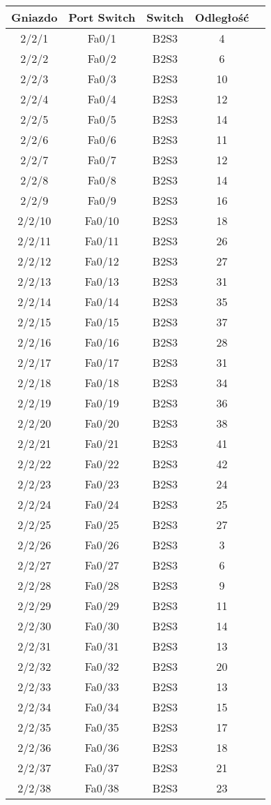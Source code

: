 \begin{center}
    \begin{longtable}{|c|c|c|c|c|}
    \hline
    Gniazdo & Port Switch & Switch & Odległość \\ \hline
	2/2/1 & Fa0/1 & B2S3 & 4 \\ \hline
	2/2/2 & Fa0/2 & B2S3 & 6 \\ \hline
	2/2/3 & Fa0/3 & B2S3 & 10 \\ \hline
	2/2/4 & Fa0/4 & B2S3 & 12 \\ \hline
	2/2/5 & Fa0/5 & B2S3 & 14 \\ \hline
	2/2/6 & Fa0/6 & B2S3 & 11 \\ \hline
	2/2/7 & Fa0/7 & B2S3 & 12 \\ \hline
	2/2/8 & Fa0/8 & B2S3 & 14 \\ \hline
	2/2/9 & Fa0/9 & B2S3 & 16 \\ \hline
	2/2/10 & Fa0/10 & B2S3 & 18 \\ \hline
	2/2/11 & Fa0/11 & B2S3 & 26 \\ \hline
	2/2/12 & Fa0/12 & B2S3 & 27 \\ \hline
	2/2/13 & Fa0/13 & B2S3 & 31 \\ \hline
	2/2/14 & Fa0/14 & B2S3 & 35 \\ \hline
	2/2/15 & Fa0/15 & B2S3 & 37 \\ \hline
	2/2/16 & Fa0/16 & B2S3 & 28 \\ \hline
	2/2/17 & Fa0/17 & B2S3 & 31 \\ \hline
	2/2/18 & Fa0/18 & B2S3 & 34 \\ \hline
	2/2/19 & Fa0/19 & B2S3 & 36 \\ \hline
	2/2/20 & Fa0/20 & B2S3 & 38 \\ \hline
	2/2/21 & Fa0/21 & B2S3 & 41 \\ \hline
	2/2/22 & Fa0/22 & B2S3 & 42 \\ \hline
	2/2/23 & Fa0/23 & B2S3 & 24 \\ \hline
	2/2/24 & Fa0/24 & B2S3 & 25 \\ \hline
	2/2/25 & Fa0/25 & B2S3 & 27 \\ \hline
	2/2/26 & Fa0/26 & B2S3 & 3 \\ \hline
	2/2/27 & Fa0/27 & B2S3 & 6 \\ \hline
	2/2/28 & Fa0/28 & B2S3 & 9 \\ \hline
	2/2/29 & Fa0/29 & B2S3 & 11 \\ \hline
	2/2/30 & Fa0/30 & B2S3 & 14 \\ \hline
	2/2/31 & Fa0/31 & B2S3 & 13 \\ \hline
	2/2/32 & Fa0/32 & B2S3 & 20 \\ \hline
	2/2/33 & Fa0/33 & B2S3 & 13 \\ \hline
	2/2/34 & Fa0/34 & B2S3 & 15 \\ \hline
	2/2/35 & Fa0/35 & B2S3 & 17 \\ \hline
	2/2/36 & Fa0/36 & B2S3 & 18 \\ \hline
	2/2/37 & Fa0/37 & B2S3 & 21 \\ \hline
	2/2/38 & Fa0/38 & B2S3 & 23 \\ \hline
\end{longtable}
\end{center}